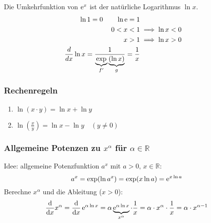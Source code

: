 \begin{definition}
    Die Umkehrfunktion von $\operatorname{e}^x$ ist der natürliche Logarithmus $\ln x$.
    \begin{align*}
        \ln 1 = 0 \qquad \ln \operatorname{e} = 1\\
        0 < x < 1 &\implies \ln x < 0\\
        x > 1 &\implies \ln x > 0\\
        \frac{d}{dx}\ln x = \frac{1}{\underbrace{\exp}_{f'}\underbrace{(\ln x)}_{g}} = \frac{1}{x}
    \end{align*}
\end{definition}

\begin{center}
\end{center}

\subsubsection*{Rechenregeln}
\begin{enumerate}
    \item $\ln(x\cdot y) = \ln x + \ln y$
    \item $\ln\left(\frac{x}{y}\right) = \ln x - \ln y \quad (y \neq 0)$
\end{enumerate}

\subsubsection*{Allgemeine Potenzen zu $x^\alpha$ für $\alpha \in \mathbb{R}$}
Idee: allgemeine Potenzfunktion $a^x$ mit $ a > 0,\, x \in \mathbb{R}$:
\begin{equation*} a^x = \exp(\ln a^x) = \exp (x \ln a) = \operatorname{e}^{x \ln a}\end{equation*}
Berechne $x^\alpha$ und die Ableitung ($x > 0$):
\[ \frac{\mathrm d}{\mathrm d x} x^\alpha = \frac{\mathrm d}{\mathrm d x} \operatorname{e}^{\alpha \ln x} = \alpha \underbrace{\operatorname{e}^{\alpha \ln x}}_{x^\alpha} \cdot \frac{1}{x} = \alpha \cdot x^\alpha \cdot \frac{1}{x} = \alpha \cdot x^{\alpha-1}\]
